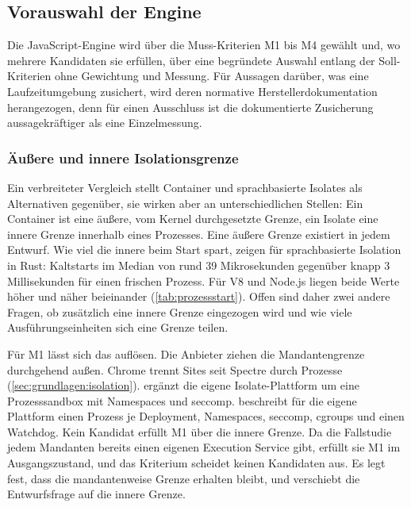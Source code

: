 \subsection{Vorauswahl der Engine}
\label{sec:vorauswahl}

Die JavaScript-Engine wird über die Muss-Kriterien M1 bis M4 gewählt und, wo mehrere Kandidaten sie erfüllen, über
eine begründete Auswahl entlang der Soll-Kriterien ohne
Gewichtung und Messung. Für Aussagen darüber, was eine Laufzeitumgebung zusichert, wird deren normative
Herstellerdokumentation herangezogen, denn für einen Ausschluss ist die dokumentierte Zusicherung aussagekräftiger
als eine Einzelmessung.

\subsubsection{Äußere und innere Isolationsgrenze}
\label{sec:zwei-grenzen}

Ein verbreiteter Vergleich stellt Container und sprachbasierte Isolates als Alternativen gegenüber, sie wirken aber an
unterschiedlichen Stellen: Ein Container ist eine äußere, vom Kernel durchgesetzte Grenze, ein Isolate eine innere
Grenze innerhalb eines Prozesses. Eine äußere Grenze existiert in jedem Entwurf. Wie viel die innere beim Start
spart, zeigen \textcite[S.~645--646]{boucher_putting_2018} für sprachbasierte Isolation in Rust: Kaltstarts im Median
von rund 39 Mikrosekunden gegenüber knapp 3 Millisekunden für einen frischen Prozess. Für V8 und Node.js liegen beide
Werte höher und näher beieinander (\autoref{tab:prozessstart}). Offen sind daher zwei andere Fragen, ob zusätzlich eine innere Grenze eingezogen wird und wie viele Ausführungseinheiten sich eine Grenze teilen.

Für M1 lässt sich das auflösen. Die Anbieter ziehen die Mandantengrenze durchgehend außen. Chrome trennt Sites seit
Spectre durch Prozesse (\autoref{sec:grundlagen:isolation}). \textcite{cloudflare_security_2026} ergänzt die eigene
Isolate-Plattform um eine Prozesssandbox mit Namespaces und seccomp.
\textcite{deno_land_inc_how_2026} beschreibt für die eigene Plattform einen Prozess je Deployment, Namespaces,
seccomp, cgroups und einen Watchdog. Kein Kandidat erfüllt M1 über die innere Grenze. Da die Fallstudie jedem
Mandanten bereits einen eigenen Execution Service gibt, erfüllt sie M1 im Ausgangszustand, und das Kriterium scheidet
keinen Kandidaten aus. Es legt fest, dass die mandantenweise Grenze erhalten bleibt, und verschiebt die Entwurfsfrage
auf die innere Grenze.

